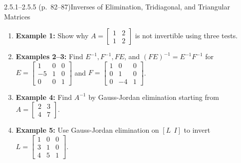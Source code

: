 \documentclass[11pt,a4paper,openany,oneside]{book}
\numberwithin{equation}{chapter}
\begin{document}
\begin{example}{2.5.1--2.5.5 (p.\ 82--87)}{Inverses of Elimination, Tridiagonal, and Triangular Matrices}
\begin{enumerate}
\item \textbf{Example 1:} Show why $A = \begin{bmatrix}1 & 2\\1 & 2\end{bmatrix}$ is not invertible using three tests.
\item \textbf{Examples 2--3:} Find $E^{-1}, F^{-1}, FE$, and $(FE)^{-1} = E^{-1}F^{-1}$ for $E = \begin{bmatrix}1&0&0\\-5&1&0\\0&0&1\end{bmatrix}$ and $F = \begin{bmatrix}1&0&0\\0&1&0\\0&-4&1\end{bmatrix}$.
\item \textbf{Example 4:} Find $A^{-1}$ by Gauss-Jordan elimination starting from $A = \begin{bmatrix}2 & 3\\4 & 7\end{bmatrix}$.
\item \textbf{Example 5:} Use Gauss-Jordan elimination on $[L \ \ I]$ to invert $L = \begin{bmatrix}1 & 0 & 0\\3 & 1 & 0\\4 & 5 & 1\end{bmatrix}$.
\end{enumerate}
\end{example}
\end{document}
